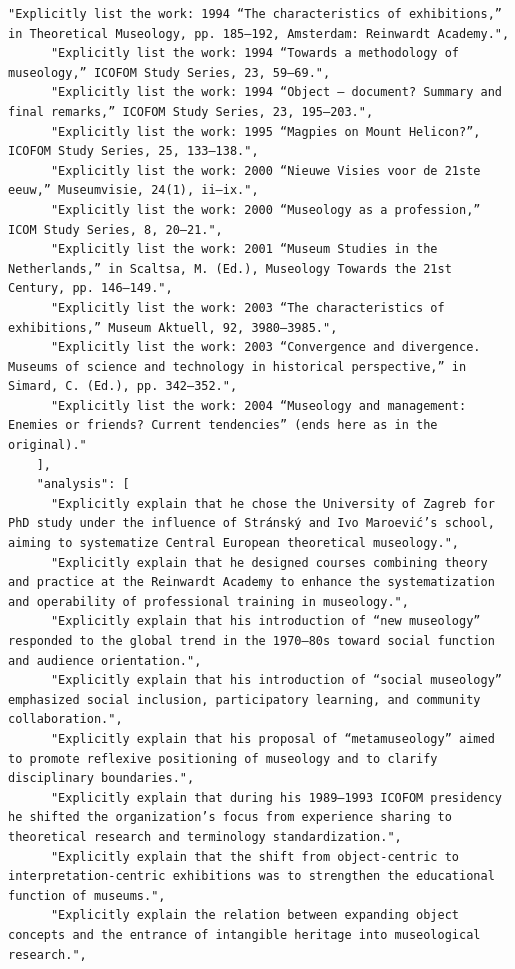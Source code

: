 \documentclass[11pt]{article}
\begin{document}
\begin{tcolorbox}[
  breakable,
  colback=porcelain,
  colframe=gray!75!black,
  left=6pt, right=6pt, top=6pt, bottom=6pt,
  fontupper=\small
]
\begin{lstlisting}[basicstyle=\ttfamily\footnotesize, breaklines=true, frame=none, numbers=none]
      "Explicitly list the work: 1994 “The characteristics of exhibitions,” in Theoretical Museology, pp. 185–192, Amsterdam: Reinwardt Academy.",
      "Explicitly list the work: 1994 “Towards a methodology of museology,” ICOFOM Study Series, 23, 59–69.",
      "Explicitly list the work: 1994 “Object – document? Summary and final remarks,” ICOFOM Study Series, 23, 195–203.",
      "Explicitly list the work: 1995 “Magpies on Mount Helicon?”, ICOFOM Study Series, 25, 133–138.",
      "Explicitly list the work: 2000 “Nieuwe Visies voor de 21ste eeuw,” Museumvisie, 24(1), ii–ix.",
      "Explicitly list the work: 2000 “Museology as a profession,” ICOM Study Series, 8, 20–21.",
      "Explicitly list the work: 2001 “Museum Studies in the Netherlands,” in Scaltsa, M. (Ed.), Museology Towards the 21st Century, pp. 146–149.",
      "Explicitly list the work: 2003 “The characteristics of exhibitions,” Museum Aktuell, 92, 3980–3985.",
      "Explicitly list the work: 2003 “Convergence and divergence. Museums of science and technology in historical perspective,” in Simard, C. (Ed.), pp. 342–352.",
      "Explicitly list the work: 2004 “Museology and management: Enemies or friends? Current tendencies” (ends here as in the original)."
    ],
    "analysis": [
      "Explicitly explain that he chose the University of Zagreb for PhD study under the influence of Stránský and Ivo Maroević’s school, aiming to systematize Central European theoretical museology.",
      "Explicitly explain that he designed courses combining theory and practice at the Reinwardt Academy to enhance the systematization and operability of professional training in museology.",
      "Explicitly explain that his introduction of “new museology” responded to the global trend in the 1970–80s toward social function and audience orientation.",
      "Explicitly explain that his introduction of “social museology” emphasized social inclusion, participatory learning, and community collaboration.",
      "Explicitly explain that his proposal of “metamuseology” aimed to promote reflexive positioning of museology and to clarify disciplinary boundaries.",
      "Explicitly explain that during his 1989–1993 ICOFOM presidency he shifted the organization’s focus from experience sharing to theoretical research and terminology standardization.",
      "Explicitly explain that the shift from object-centric to interpretation-centric exhibitions was to strengthen the educational function of museums.",
      "Explicitly explain the relation between expanding object concepts and the entrance of intangible heritage into museological research.",

\end{lstlisting}
\end{tcolorbox}
\end{document}
